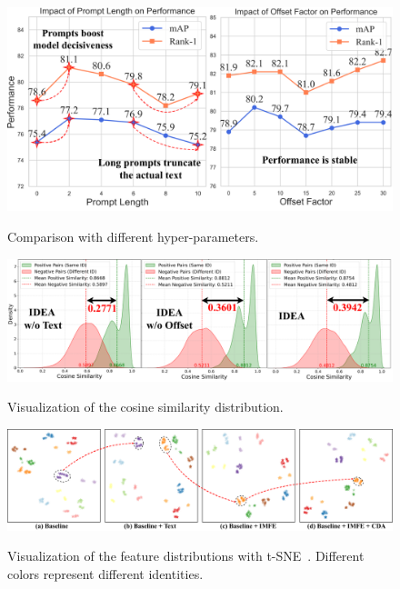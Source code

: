 \begin{figure}[t]
  \centering
    \resizebox{0.475\textwidth}{!}
    {
  \includegraphics[width=1.\linewidth]{sec/img/Hyper.pdf}
  }
  \vspace{-5mm}
   \caption{Comparison with different hyper-parameters.}
  \label{fig:hyper}
  \vspace{-2mm}
\end{figure}
\begin{figure}[t]
  \centering
    \resizebox{0.475\textwidth}{!}
    {
  \includegraphics[width=30.\linewidth]{sec/img/CosDis.pdf}
  }
  \vspace{-5mm}
   \caption{Visualization of the cosine similarity distribution.}
  \label{fig:cosine}
  \vspace{-4mm}
\end{figure}
\begin{figure}[t]
  \centering
    \resizebox{0.96\textwidth}{!}
    {
  \includegraphics[width=1\linewidth]{sec/img/tsne.pdf}
  }
  \vspace{-2mm}
   \caption{Visualization of the feature distributions with t-SNE~\cite{van2008visualizing}.
   Different colors represent different identities.}
  \label{fig:tsne}
  \vspace{-5mm}
\end{figure}
